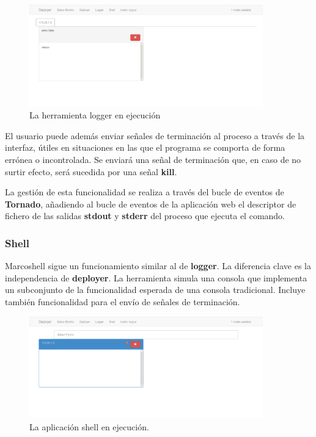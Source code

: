 \begin{figure}[H]
\centering
\includegraphics[width=0.9\textwidth]{Chapters/Chapter5/Figures/logger-deployer}
\caption[La herramienta logger en ejecución]{La herramienta logger en ejecución}
\end{figure}

El usuario puede además enviar señales de terminación al proceso a través de la interfaz, útiles en situaciones en las que el programa se comporta de forma errónea o incontrolada. Se enviará una señal de terminación que, en caso de no surtir efecto, será sucedida por una señal \textbf{kill}. 

La gestión de esta funcionalidad se realiza a través del bucle de eventos de \textbf{Tornado}, añadiendo al bucle de eventos de la aplicación web el descriptor de fichero de las salidas \textbf{stdout} y \textbf{stderr} del proceso que ejecuta el comando.

\subsubsection{Shell}

Marcoshell sigue un funcionamiento similar al de \textbf{logger}. La diferencia clave es la independencia de \textbf{deployer}. La herramienta simula una consola que implementa un subconjunto de la funcionalidad esperada de una consola tradicional. Incluye también funcionalidad para el envío de señales de terminación.

\begin{figure}[H]
\centering
\includegraphics[width=0.9\textwidth]{Chapters/Chapter5/Figures/logger-shell}
\caption[La aplicación shell en ejecución]{La aplicación shell en ejecución.}
\end{figure}

